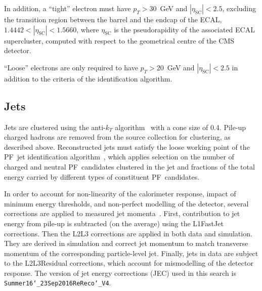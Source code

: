 In addition, a ``tight'' electron must have $p_{T} > 30$~GeV and $|\eta_\text{SC}| < 2.5$, excluding the transition region between the barrel and the endcap of the ECAL, $1.4442 < |\eta_\text{SC}| < 1.5660$, where $\eta_\text{SC}$ is the pseudorapidity of the associated ECAL supercluster, computed with respect to the geometrical centre of the CMS detector.

``Loose'' electrons are only required to have $p_{T} > 20$~GeV and $|\eta_\text{SC}| < 2.5$ in addition to the criteria of the identification algorithm.

\subsection*{Jets}\label{subsec:jets}
Jets are clustered using the anti-$k_{T}$ algorithm~\cite{Cacciari:2008gp} with a cone size of 0.4.
Pile-up charged hadrons are removed from the source collection for clustering, as described above.
Reconstructed jets must satisfy the loose working point of the PF~jet identification algorithm~\cite{Wiki:JetID}, which applies selection on the number of charged and neutral PF~candidates clustered in the jet and fractions of the total energy carried by different types of constituent PF~candidates.

In order to account for non-linearity of the calorimeter response, impact of minimum energy thresholds, and non-perfect modelling of the detector, several corrections are applied to measured jet momenta~\cite{Khachatryan:2016kdb, CMS-DP-2016-020}.
First, contribution to jet energy from pile-up is subtracted (on the average) using the L1FastJet corrections.
Then the L2L3 corrections are applied in both data and simulation.
They are derived in simulation and correct jet momentum to match transverse momentum of the corresponding particle-level jet.
Finally, jets in data are subject to the L2L3Residual corrections, which account for mismodelling of the detector response.
The version of jet energy corrections (JEC) used in this search is \texttt{Summer16\char`_23Sep2016ReReco\char`_V4}.

